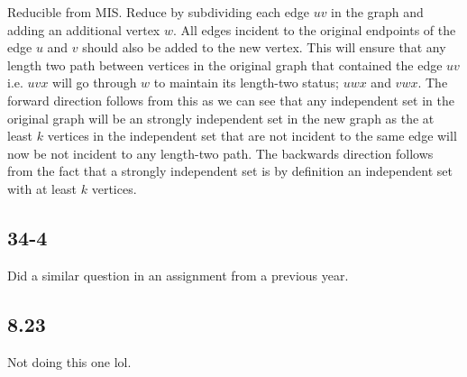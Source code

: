 \documentclass[11pt]{article}
\begin{document}
Reducible from MIS. Reduce by subdividing each edge $uv$ in the graph and adding an additional vertex $w$. All edges incident to the original endpoints of the edge $u$ and $v$ should also be added to the new vertex. This will ensure that any length two path between vertices in the original graph that contained the edge $uv$ i.e. $uvx$ will go through $w$ to maintain its length-two status; $uwx$ and $vwx$. The forward direction follows from this as we can see that any independent set in the original graph will be an strongly independent set in the new graph as the at least $k$ vertices in the independent set that are not incident to the same edge will now be not incident to any length-two path. The backwards direction follows from the fact that a strongly independent set is by definition an independent set with at least $k$ vertices.

\subsection{34-4}

Did a similar question in an assignment from a previous year.

\subsection{8.23}

Not doing this one lol.
\end{document}
